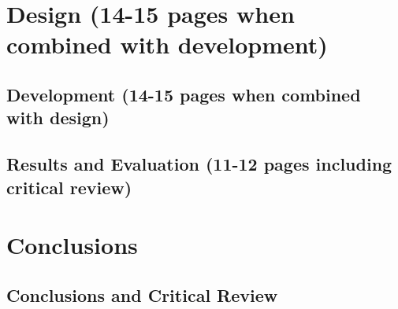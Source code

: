 \documentclass[10pt]{article}
\begin{document}
\section{Design (14-15 pages when combined with development)}

\subsection {Development (14-15 pages when combined with design)}

\subsection {Results and Evaluation (11-12 pages including critical review)}

\section {Conclusions}

\subsection {Conclusions and Critical Review}

\printbibliography
\end{document}
